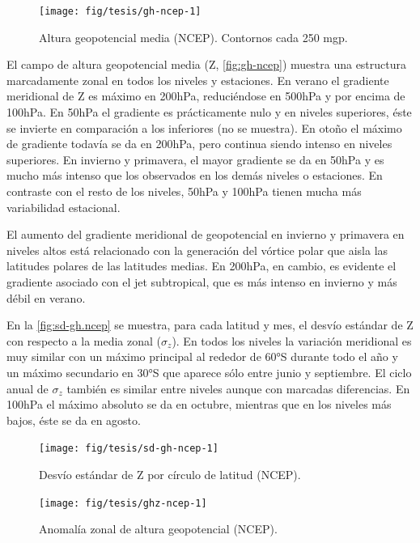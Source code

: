 \documentclass[spanish,a4paper,12pt,oneside]{book}
\begin{document}
\begin{landscape}\begin{figure}

{\centering \texttt{[image: fig/tesis/gh-ncep-1]} 

}

\caption{Altura geopotencial media (NCEP). Contornos cada 250 mgp.}\label{fig:gh-ncep}
\end{figure}
\end{landscape}

El campo de altura geopotencial media (Z, \autoref{fig:gh-ncep}) muestra
una estructura marcadamente zonal en todos los niveles y estaciones. En
verano el gradiente meridional de Z es máximo en 200hPa, reduciéndose en
500hPa y por encima de 100hPa. En 50hPa el gradiente es prácticamente
nulo y en niveles superiores, éste se invierte en comparación a los
inferiores (no se muestra). En otoño el máximo de gradiente todavía se
da en 200hPa, pero continua siendo intenso en niveles superiores. En
invierno y primavera, el mayor gradiente se da en 50hPa y es mucho más
intenso que los observados en los demás niveles o estaciones. En
contraste con el resto de los niveles, 50hPa y 100hPa tienen mucha más
variabilidad estacional.

El aumento del gradiente meridional de geopotencial en invierno y
primavera en niveles altos está relacionado con la generación del
vórtice polar que aisla las latitudes polares de las latitudes medias.
En 200hPa, en cambio, es evidente el gradiente asociado con el jet
subtropical, que es más intenso en invierno y más débil en verano.

En la \autoref{fig:sd-gh.ncep} se muestra, para cada latitud y mes, el
desvío estándar de Z con respecto a la media zonal (\(\sigma_z\)). En
todos los niveles la variación meridional es muy similar con un máximo
principal al rededor de 60°S durante todo el año y un máximo secundario
en 30°S que aparece sólo entre junio y septiembre. El ciclo anual de
\(\sigma_z\) también es similar entre niveles aunque con marcadas
diferencias. En 100hPa el máximo absoluto se da en octubre, mientras que
en los niveles más bajos, éste se da en agosto.

\begin{figure}
\texttt{[image: fig/tesis/sd-gh-ncep-1]} \caption{Desvío estándar de Z por círculo de latitud (NCEP).}\label{fig:sd-gh-ncep}
\end{figure}

\begin{landscape}\begin{figure}

{\centering \texttt{[image: fig/tesis/ghz-ncep-1]} 

}

\caption{Anomalía zonal de altura geopotencial (NCEP).}\label{fig:ghz-ncep}
\end{figure}
\end{landscape}
\end{document}

